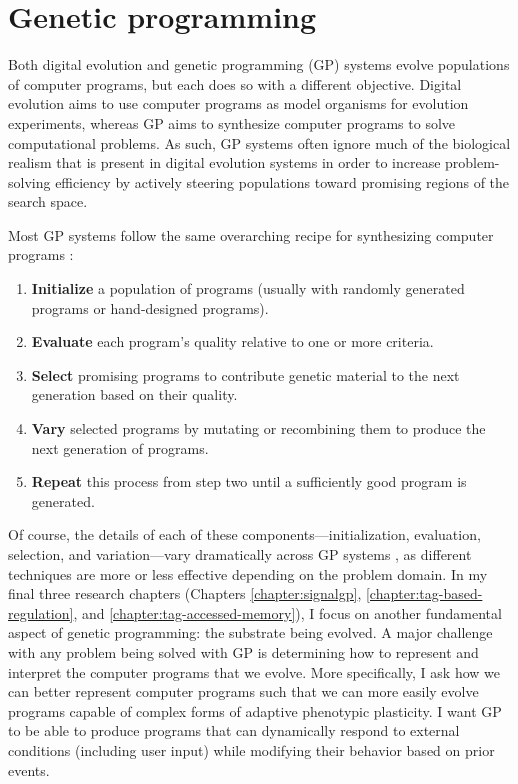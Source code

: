 \section{Genetic programming}

Both digital evolution and genetic programming (GP) systems evolve populations of computer programs, but each does so with a different objective.
Digital evolution aims to use computer programs as model organisms for evolution experiments, whereas GP aims to synthesize computer programs to solve computational problems.
As such, GP systems often ignore much of the biological realism that is present in digital evolution systems in order to increase problem-solving efficiency by actively steering populations toward promising regions of the search space.

Most GP systems follow the same overarching recipe for synthesizing computer programs \citep{ofria_avida:_2009}:

\begin{displayquote}
\begin{enumerate}
    \item \textbf{Initialize} a population of programs (usually with randomly generated programs or hand-designed programs).
    \item \textbf{Evaluate} each program's quality relative to one or more criteria.
    \item \textbf{Select} promising programs to contribute genetic material to the next generation based on their quality.
    \item \textbf{Vary} selected programs by mutating or recombining them to produce the next generation of programs. 
    \item \textbf{Repeat} this process from step two until a sufficiently good program is generated.
\end{enumerate}
\end{displayquote}

Of course, the details of each of these components---initialization, evaluation, selection, and variation---vary dramatically across GP systems \citep{poli_field_2008}, as different techniques are more or less effective depending on the problem domain.
In my final three research chapters (Chapters \ref{chapter:signalgp}, \ref{chapter:tag-based-regulation}, and \ref{chapter:tag-accessed-memory}), I focus on another fundamental aspect of genetic programming: the substrate being evolved.
A major challenge with any problem being solved with GP is determining how to represent and interpret the computer programs that we evolve. 
More specifically, I ask how we can better represent computer programs such that we can more easily evolve programs capable of complex forms of adaptive phenotypic plasticity.  
I want GP to be able to produce programs that can dynamically respond to external conditions (including user input) while modifying their behavior based on prior events.

